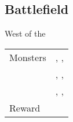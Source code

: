 \subsection{Battlefield}
\label{map:battlefield_02}

West of the 

\begin{longtable}{ l p{9cm} }
	Monsters
	& \nameref{monster:poison_toad}, \nameref{monster:poison_toad}, \nameref{monster:poison_toad} \\
	& \nameref{monster:poison_toad}, \nameref{monster:poison_toad}, \nameref{monster:basilisk} \\
	& \nameref{monster:poison_toad}, \nameref{monster:poison_toad}, \nameref{monster:mad_plant}
\\
	Reward & \nameref{armor:charm}
\end{longtable}
